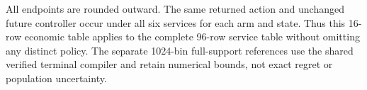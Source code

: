 \noindent All endpoints are rounded outward. The same returned action and unchanged future controller occur under all six services for each arm and state. Thus this 16-row economic table applies to the complete 96-row service table without omitting any distinct policy. The separate 1024-bin full-support references use the shared verified terminal compiler and retain numerical bounds, not exact regret or population uncertainty.
\endgroup
